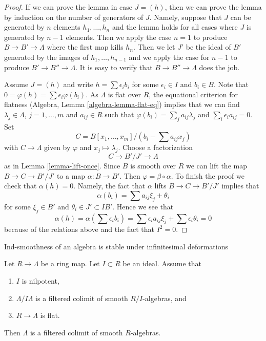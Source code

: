 \begin{proof}
If we can prove the lemma in case $J = (h)$, then we can prove the
lemma by induction on the number of generators of $J$. Namely, suppose
that $J$ can be generated by $n$ elements $h_1, \ldots, h_n$ and the
lemma holds for all cases where $J$ is generated by $n - 1$ elements.
Then we apply the case $n = 1$ to produce $B \to B' \to \Lambda$
where the first map kills $h_n$. Then we let $J'$ be the
ideal of $B'$ generated by the images of $h_1, \ldots, h_{n - 1}$
and we apply the case for $n - 1$ to produce $B' \to B'' \to \Lambda$.
It is easy to verify that $B \to B'' \to \Lambda$ does the job.

\medskip\noindent
Assume $J = (h)$ and write $h = \sum \epsilon_i b_i$
for some $\epsilon_i \in I$ and $b_i \in B$. Note that
$0 = \varphi(h) = \sum \epsilon_i \varphi(b_i)$.
As $\Lambda$ is flat over $R$, the equational criterion for
flatness (Algebra, Lemma \ref{algebra-lemma-flat-eq})
implies that we can find $\lambda_j \in \Lambda$,
$j = 1, \ldots, m$ and $a_{ij} \in R$ such that
$\varphi(b_i) = \sum_j a_{ij} \lambda_j$ and $\sum_i \epsilon_i a_{ij} = 0$.
Set
$$
C = B[x_1, \ldots, x_m]/(b_i - \sum a_{ij} x_j)
$$
with $C \to \Lambda$ given by $\varphi$ and $x_j \mapsto \lambda_j$.
Choose a factorization
$$
C \to B'/J' \to \Lambda
$$
as in Lemma \ref{lemma-lift-once}. Since $B$ is smooth over $R$ we can
lift the map $B \to C \to B'/J'$ to a map $\alpha : B \to B'$. Then
$\varphi = \beta \circ \alpha$. To finish the proof we check that
$\alpha(h) = 0$. Namely, the fact that $\alpha$ lifts
$B \to C \to B'/J'$ implies that
$$
\alpha(b_i) = \sum a_{ij} \xi_j + \theta_i
$$
for some $\xi_j \in B'$ and $\theta_i \in J' \subset IB'$.
Hence we see that
$$
\alpha(h) = \alpha(\sum \epsilon_i b_i) =
\sum \epsilon_i a_{ij} \xi_j + \sum \epsilon_i \theta_i = 0
$$
because of the relations above and the fact that $I^2 = 0$.
\end{proof}

\begin{proposition}
\label{proposition-lift}
\begin{slogan}
Ind-smoothness of an algebra is stable under infinitesimal deformations
\end{slogan}
Let $R \to \Lambda$ be a ring map. Let $I \subset R$ be an ideal.
Assume that
\begin{enumerate}
\item $I$ is nilpotent,
\item $\Lambda/I\Lambda$ is a filtered colimit of smooth $R/I$-algebras, and
\item $R \to \Lambda$ is flat.
\end{enumerate}
Then $\Lambda$ is a filtered colimit of smooth $R$-algebras.
\end{proposition}

